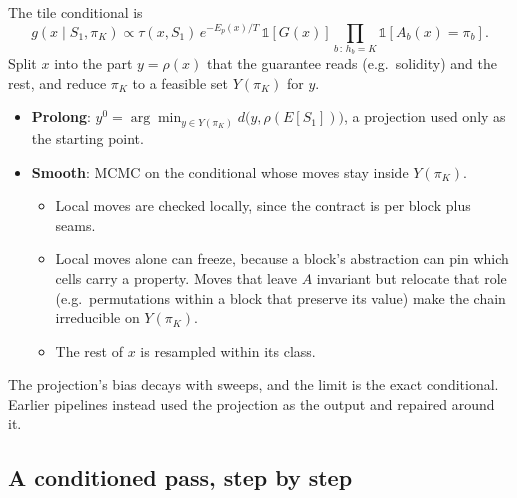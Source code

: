 \documentclass[11pt]{article}
\newcommand{\1}{\mathds{1}}
\begin{document}
The tile conditional is
\[
  g(x \mid S_1, \pi_K) \propto \tau(x, S_1)\, e^{-E_p(x)/T}\, \1[G(x)]
  \prod_{b\,:\,h_b = K} \1[A_b(x) = \pi_b].
\]
Split $x$ into the part $y = \rho(x)$ that the guarantee reads (e.g.\ solidity) and the rest,
and reduce $\pi_K$ to a feasible set $Y(\pi_K)$ for $y$.
\begin{itemize}
  \item \textbf{Prolong}: $y^0 = \arg\min_{y \in Y(\pi_K)} d\big(y, \rho(E[S_1])\big)$, a
        projection used only as the starting point.
  \item \textbf{Smooth}: MCMC on the conditional whose moves stay inside $Y(\pi_K)$.
        \begin{itemize}
          \item Local moves are checked locally, since the contract is per block plus seams.
          \item Local moves alone can freeze, because a block's abstraction can pin which cells
                carry a property. Moves that leave $A$ invariant but relocate that role (e.g.\
                permutations within a block that preserve its value) make the chain
                irreducible on $Y(\pi_K)$.
          \item The rest of $x$ is resampled within its class.
        \end{itemize}
\end{itemize}
The projection's bias decays with sweeps, and the limit is the exact conditional. Earlier
pipelines instead used the projection as the output and repaired around it.

\subsection{A conditioned pass, step by step}
\end{document}
